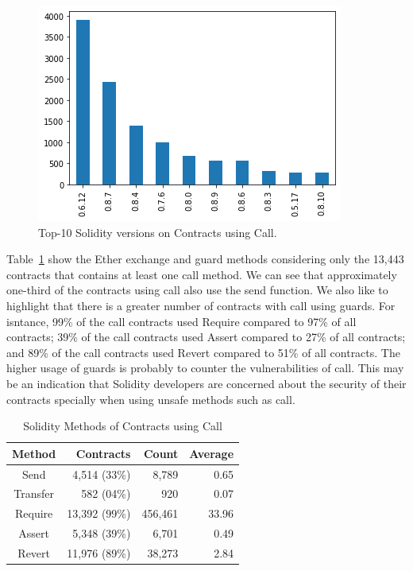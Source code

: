\documentclass[10pt,conference]{IEEEtran}
\begin{document}
\begin{figure}[h]
  \centering
  \includegraphics[width=\linewidth]{img/call_clean_v2.png}
  \caption{Top-10 Solidity versions on Contracts using Call. }
  \label{fig:call_version}
\end{figure}

Table~\ref{tab:call} show the Ether exchange and guard methods considering only the 13,443 contracts that contains at least one call method.  We can see that approximately one-third of the contracts using call also use the send function.  We also like to highlight that there is a greater number of contracts with call using guards. For isntance,  99\% of the call contracts used Require compared to 97\% of all contracts; 39\% of the call contracts used Assert compared to 27\%  of all contracts; and 89\% of the call contracts used Revert compared to 51\% of all contracts. The higher usage of guards is probably to counter the vulnerabilities of call. This may be an indication that Solidity developers are concerned about the security of their contracts specially when using unsafe methods such as call. 

\begin{table}
\center
  \caption{Solidity Methods of Contracts using Call}
  \label{tab:call}
  \begin{tabular}{crrr}
    \hline
    Method & Contracts & Count & Average\\
    \hline
    Send & 4,514 (33\%) & 8,789 & 0.65\\
    Transfer &582 (04\%) & 920 & 0.07\\
    Require &13,392 (99\%) & 456,461 & 33.96 \\
    Assert & 5,348 (39\%) & 6,701 & 0.49\\
    Revert & 11,976 (89\%) & 38,273 & 2.84\\
\end{tabular}
\end{table}
\end{document}
